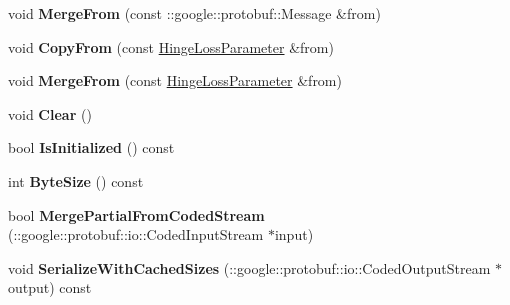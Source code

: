 \begin{DoxyCompactItemize}
\item 
\mbox{\label{classcaffe_1_1_hinge_loss_parameter_aee9512102a2e27bc388b1d9d8ccf81af}} 
void {\bfseries Merge\+From} (const \+::google\+::protobuf\+::\+Message \&from)
\item 
\mbox{\label{classcaffe_1_1_hinge_loss_parameter_ab6dea5e139a3f60a923763e24863f841}} 
void {\bfseries Copy\+From} (const \mbox{\hyperlink{classcaffe_1_1_hinge_loss_parameter}{Hinge\+Loss\+Parameter}} \&from)
\item 
\mbox{\label{classcaffe_1_1_hinge_loss_parameter_a85a76548810d09a92c579a2cc1429e07}} 
void {\bfseries Merge\+From} (const \mbox{\hyperlink{classcaffe_1_1_hinge_loss_parameter}{Hinge\+Loss\+Parameter}} \&from)
\item 
\mbox{\label{classcaffe_1_1_hinge_loss_parameter_a1b38fa607530b05660b4f02e39d2943a}} 
void {\bfseries Clear} ()
\item 
\mbox{\label{classcaffe_1_1_hinge_loss_parameter_a8916022a6f2292f2eab8cc9150aae4ca}} 
bool {\bfseries Is\+Initialized} () const
\item 
\mbox{\label{classcaffe_1_1_hinge_loss_parameter_a5895f5b3a4f75fccc36018bc39f37ea2}} 
int {\bfseries Byte\+Size} () const
\item 
\mbox{\label{classcaffe_1_1_hinge_loss_parameter_a6e40cf2b37130609effcd13eaa3931a6}} 
bool {\bfseries Merge\+Partial\+From\+Coded\+Stream} (\+::google\+::protobuf\+::io\+::\+Coded\+Input\+Stream $\ast$input)
\item 
\mbox{\label{classcaffe_1_1_hinge_loss_parameter_af760348be7560d58be07ab49a997cdef}} 
void {\bfseries Serialize\+With\+Cached\+Sizes} (\+::google\+::protobuf\+::io\+::\+Coded\+Output\+Stream $\ast$output) const
\item 
\mbox{\label{classcaffe_1_1_hinge_loss_parameter_a33351db190fee05b45e2868b852a5027}} 

\end{DoxyCompactItemize}
